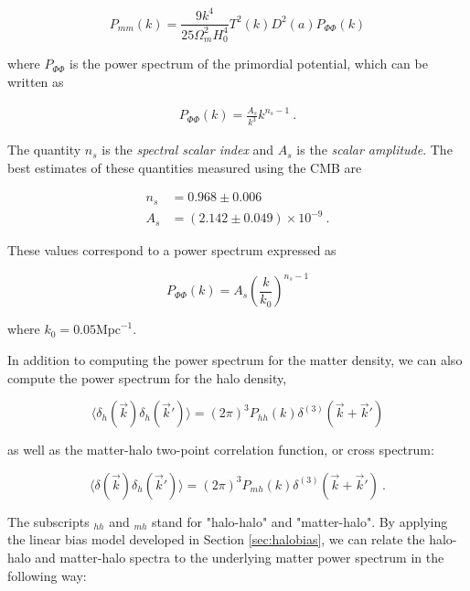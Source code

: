 \documentclass[10pt,letterpaper,final]{iopart}
\numberwithin{equation}{subsection}
\def\ni{\noindent}
\begin{document}
\begin{equation}\label{eq:P_mm2}
P_{mm}(k) = \frac{9k^4}{25\Omega_m^2 H_0^4}T^2(k)D^2(a) P_{\Phi\Phi}(k)
\end{equation}

\ni where $P_{\Phi\Phi}$ is the power spectrum of the primordial potential, which can be written as \cite{Dodelson}

\begin{align}\label{eq:P_p}
P_{\Phi\Phi}(k) = \frac{A_s}{k^3} k^{n_s -1} \ .
\end{align}

\ni The quantity $n_s$ is the \emph{spectral scalar index} and $A_s$ is the \emph{scalar amplitude}. The best estimates of these quantities measured using the CMB are \cite{Planck1}

\begin{align}
n_s &= 0.968 \pm 0.006 \\
A_s &= (2.142 \pm 0.049) \times 10^{-9} \ .
\end{align}

\ni These values correspond to a power spectrum expressed as \cite{Planck1}

\begin{equation}\label{eq:P_p_Planck}
P_{\Phi\Phi}(k) = A_s \left(\frac{k}{k_0}\right)^{n_s - 1} 
\end{equation}

\ni where $k_0 = 0.05 \text{Mpc}^{-1}$. 

In addition to computing the power spectrum for the matter density, we can also compute the power spectrum for the halo density,

\begin{equation}\label{eq:P_hh}
\langle \delta_h(\vec{k})\delta_h(\vec{k}') \rangle = (2\pi)^3 P_{hh}(k) \delta^{(3)}(\vec{k} + \vec{k}')
\end{equation}

\ni as well as the matter-halo two-point correlation function, or cross spectrum: 

\begin{equation}\label{eq:P_mh}
\langle \delta(\vec{k})\delta_h(\vec{k}') \rangle = (2\pi)^3 P_{mh}(k) \delta^{(3)}(\vec{k} + \vec{k}') \ .
\end{equation}

\ni The subscripts $_{hh}$ and $_{mh}$ stand for "halo-halo" and "matter-halo". By applying the linear bias model developed in Section \ref{sec:halobias}, we can relate the halo-halo and matter-halo spectra to the underlying matter power spectrum in the following way:
\end{document}
